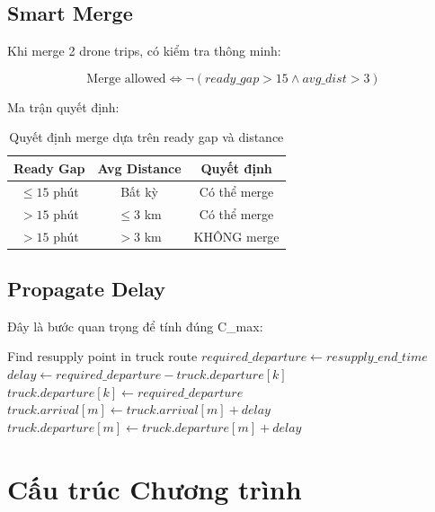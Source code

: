 \documentclass[12pt,a4paper]{article}
\begin{document}
\subsection{Smart Merge}

Khi merge 2 drone trips, có kiểm tra thông minh:

\begin{equation}
    \text{Merge allowed} \Leftrightarrow \neg(ready\_gap > 15 \land avg\_dist > 3)
\end{equation}

Ma trận quyết định:
\begin{table}[H]
\centering
\caption{Quyết định merge dựa trên ready gap và distance}
\begin{tabular}{ccc}
\toprule
\textbf{Ready Gap} & \textbf{Avg Distance} & \textbf{Quyết định} \\
\midrule
$\leq 15$ phút & Bất kỳ & Có thể merge \\
$> 15$ phút & $\leq 3$ km & Có thể merge \\
$> 15$ phút & $> 3$ km & KHÔNG merge \\
\bottomrule
\end{tabular}
\end{table}

\subsection{Propagate Delay}

Đây là bước quan trọng để tính đúng C\_max:

\begin{algorithm}[H]
\caption{Propagate Delay}
\begin{algorithmic}[1]
    \STATE Find resupply point in truck route
    \STATE $required\_departure \leftarrow resupply\_end\_time$
        \STATE $delay \leftarrow required\_departure - truck.departure[k]$
        \STATE $truck.departure[k] \leftarrow required\_departure$
            \STATE $truck.arrival[m] \leftarrow truck.arrival[m] + delay$
            \STATE $truck.departure[m] \leftarrow truck.departure[m] + delay$
        \ENDFOR
    \ENDIF
\ENDFOR
\end{algorithmic}
\end{algorithm}

\section{Cấu trúc Chương trình}
\end{document}
